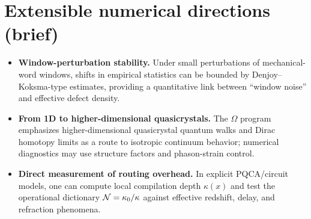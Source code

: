 \section{Extensible numerical directions (brief)}
\label{app:extensions}

\begin{itemize}
  \item \textbf{Window-perturbation stability.} Under small perturbations of mechanical-word windows, shifts in empirical statistics can be bounded by Denjoy--Koksma-type estimates, providing a quantitative link between ``window noise'' and effective defect density.
  \item \textbf{From 1D to higher-dimensional quasicrystals.} The $\Omega$ program emphasizes higher-dimensional quasicrystal quantum walks and Dirac homotopy limits as a route to isotropic continuum behavior; numerical diagnostics may use structure factors and phason-strain control.
  \item \textbf{Direct measurement of routing overhead.} In explicit PQCA/circuit models, one can compute local compilation depth $\kappa(x)$ and test the operational dictionary $\mathcal{N}=\kappa_0/\kappa$ against effective redshift, delay, and refraction phenomena.
\end{itemize}


